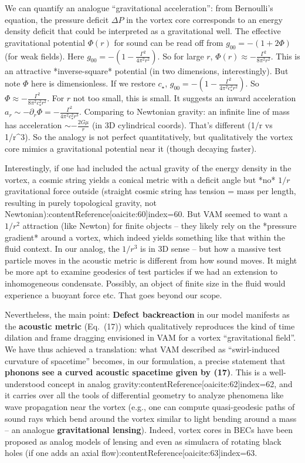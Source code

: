 \documentclass[12pt]{article}
\begin{document}
We can quantify an analogue “gravitational acceleration”: from Bernoulli’s equation, the pressure deficit $\Delta P$ in the vortex core corresponds to an energy density deficit that could be interpreted as a gravitational well. The effective gravitational potential $\Phi(r)$ for sound can be read off from $g_{00} = -(1+2\Phi)$ (for weak fields). Here $g_{00} = -(1 - \frac{\Gamma^2}{4\pi^2r^2})$. So for large $r$, $\Phi(r) \approx -\frac{\Gamma^2}{8\pi^2 r^2}$. This is an attractive *inverse-square* potential (in two dimensions, interestingly). But note $\Phi$ here is dimensionless. If we restore $c_\star$, $g_{00}=-(1 - \frac{\Gamma^2}{4\pi^2 c_\star^2 r^2})$. So $\Phi \approx -\frac{\Gamma^2}{8\pi^2 c_\star^2 r^2}$. For $r$ not too small, this is small. It suggests an inward acceleration $a_r \sim -\partial_r \Phi = -\frac{\Gamma^2}{4\pi^2 c_\star^2 r^3}$. Comparing to Newtonian gravity: an infinite line of mass has acceleration $\sim -\frac{2G\mu}{r}$ (in 3D cylindrical coords). That’s different (1/r vs 1/r^3). So the analogy is not perfect quantitatively, but qualitatively the vortex core mimics a gravitational potential near it (though decaying faster). 

Interestingly, if one had included the actual gravity of the energy density in the vortex, a cosmic string yields a conical metric with a deficit angle but *no* $1/r$ gravitational force outside (straight cosmic string has tension = mass per length, resulting in purely topological gravity, not Newtonian):contentReference[oaicite:60]{index=60}. But VAM seemed to want a $1/r^2$ attraction (like Newton) for finite objects – they likely rely on the *pressure gradient* around a vortex, which indeed yields something like that within the fluid context. In our analog, the $1/r^3$ is in 3D sense – but how a massive test particle moves in the acoustic metric is different from how sound moves. It might be more apt to examine geodesics of test particles if we had an extension to inhomogeneous condensate. Possibly, an object of finite size in the fluid would experience a buoyant force etc. That goes beyond our scope.

Nevertheless, the main point: \textbf{Defect backreaction} in our model manifests as the \textbf{acoustic metric} (Eq. (17)) which qualitatively reproduces the kind of time dilation and frame dragging envisioned in VAM for a vortex “gravitational field”. We have thus achieved a translation: what VAM described as “swirl-induced curvature of spacetime” becomes, in our formulation, a precise statement that \textbf{phonons see a curved acoustic spacetime given by (17)}. This is a well-understood concept in analog gravity:contentReference[oaicite:62]{index=62}, and it carries over all the tools of differential geometry to analyze phenomena like wave propagation near the vortex (e.g., one can compute quasi-geodesic paths of sound rays which bend around the vortex similar to light bending around a mass – an analogue \textbf{gravitational lensing}). Indeed, vortex cores in BECs have been proposed as analog models of lensing and even as simulacra of rotating black holes (if one adds an axial flow):contentReference[oaicite:63]{index=63}.
\end{document}
